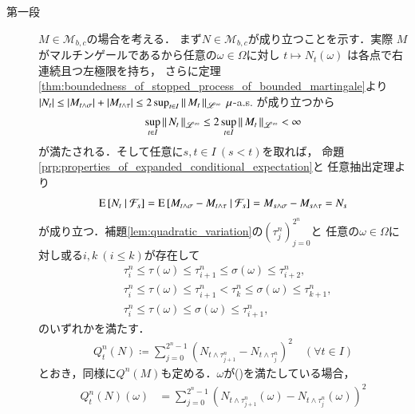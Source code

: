 	\begin{prf}\mbox{}
		\begin{description}
			\item[第一段] $M \in \mathcal{M}_{b,c}$の場合を考える．
				まず$N \in \mathcal{M}_{b,c}$が成り立つことを示す．実際
				$M$がマルチンゲールであるから任意の$\omega \in \Omega$に対し
				$t \longmapsto N_t(\omega)$
				は各点で右連続且つ左極限を持ち，
				さらに定理\ref{thm:boundedness_of_stopped_process_of_bounded_martingale}より
				$|N_t| \leq |M_{t\wedge\sigma}| + |M_{t\wedge\tau}| \leq 2 \sup{t \in I}{\Norm{M_t}{\mathscr{L}^\infty}}\ \mu$-a.s.
				が成り立つから
				\begin{align}
					\operatorname*{sup}_{t \in I} \left\|\, N_t\, \right\|_{\mathscr{L}^\infty}
					\leq 2 \operatorname*{sup}_{t \in I} \left\|\, M_t\, \right\|_{\mathscr{L}^\infty} < \infty
				\end{align}
				が満たされる．そして任意に$s,t \in I\ (s < t)$を取れば，
				命題\ref{prp:properties_of_expanded_conditional_expectation}と
				任意抽出定理より
				\begin{align}
					\operatorname{E} \left[ N_t \ \middle|\ \mathcal{F}_s \right]
					= \operatorname{E} \left[ M_{t \wedge \sigma} - M_{t \wedge \tau} \ \middle|\ \mathcal{F}_s \right]
					= M_{s \wedge \sigma} - M_{s \wedge \tau}
					= N_s
				\end{align}
				が成り立つ．補題\ref{lem:quadratic_variation}の$(\tau^n_j)_{j=0}^{2^n}$と
				任意の$\omega \in \Omega$に対し或る$i,k\ (i \leq k)$が存在して
				\begin{align}
					&\tau_i^n \leq \tau(\omega) \leq \tau_{i+1}^n \leq \sigma(\omega) \leq \tau_{i+2}^n, \label{eq:stopped_quadratic_variation_1} \\
					&\tau_i^n \leq \tau(\omega) \leq \tau_{i+1}^n < \tau^n_k \leq \sigma(\omega) \leq \tau_{k+1}^n, \label{eq:stopped_quadratic_variation_2} \\
					&\tau_i^n \leq \tau(\omega) \leq \sigma(\omega) \leq \tau_{i+1}^n, \label{eq:stopped_quadratic_variation_3}
				\end{align}
				のいずれかを満たす．
				\begin{align}
					Q^n_t(N) \coloneqq \sum_{j=0}^{2^n-1} \left( N_{t \wedge \tau_{j+1}^n} - N_{t \wedge \tau_j^n} \right)^2 \quad (\forall t \in I)
				\end{align}
				とおき，同様に$Q^n(M)$も定める．$\omega$が()を満たしている場合，
				\begin{align}
					Q^n_t(N)(\omega) &= \sum_{j=0}^{2^n-1} \left( N_{t \wedge \tau_{j+1}^n}(\omega) - N_{t \wedge \tau_j^n}(\omega) \right)^2 \\

\end{align}
\end{description}
\end{prf}
